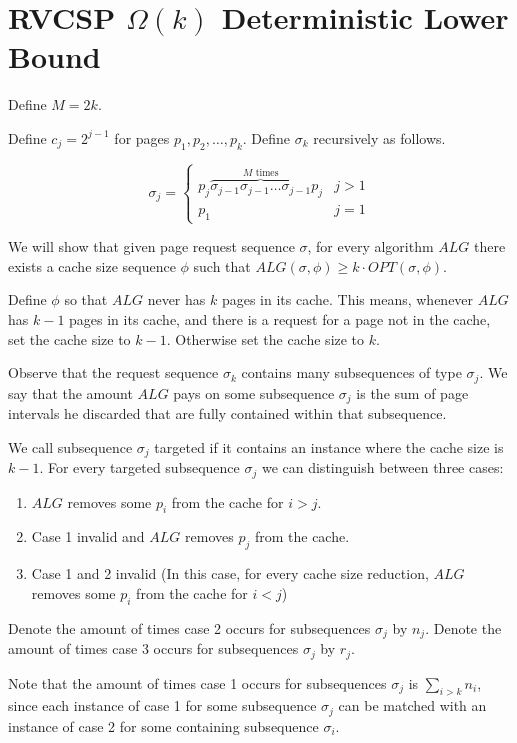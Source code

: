 \documentclass[12pt]{article}
\begin{document}
\section{RVCSP $\Omega(k)$ Deterministic Lower Bound}

Define $M=2k$. 

Define $c_j=2^{j-1}$ for pages $p_1, p_2, \ldots, p_k$.
Define $\sigma_k$ recursively as follows. 

\[
\sigma_j = \begin{cases}
  p_j \overbrace{\sigma_{j-1} \sigma_{j-1} \ldots \sigma_{j-1} }^{\text{$M$ times}} p_j & j > 1 \\
  p_1 & j = 1
\end{cases}
\] 

We will show that given page request sequence $\sigma$, for every algorithm $ALG$ there exists a cache size sequence $\phi$ such that $ALG(\sigma, \phi) \geq k \cdot OPT(\sigma, \phi)$.

Define $\phi$ so that $ALG$ never has $k$ pages in its cache. This means, whenever $ALG$ has $k-1$ pages in its cache, and there is a request for a page not in the cache, set the cache size to $k-1$. Otherwise set the cache size to $k$.

Observe that the request sequence $\sigma_k$ contains many subsequences of type $\sigma_j$. We say that the amount $ALG$ pays on some subsequence $\sigma_j$ is the sum of page intervals he discarded that are fully contained within that subsequence. 

We call subsequence $\sigma_j$ targeted if it contains an instance where the cache size is $k-1$.
For every targeted subsequence $\sigma_j$ we can distinguish between three cases:

\begin{enumerate}
  \item $ALG$ removes some $p_i$ from the cache for $i > j$. 
  \item Case 1 invalid and $ALG$ removes $p_j$ from the cache. 
  \item Case 1 and 2 invalid (In this case, for every cache size reduction, $ALG$ removes some $p_i$ from the cache for $i < j$)
\end{enumerate}

Denote the amount of times case 2 occurs for subsequences $\sigma_j$ by $n_j$. Denote the amount of times case 3 occurs for subsequences $\sigma_j$ by $r_j$.

Note that the amount of times case 1 occurs for subsequences $\sigma_j$ is $\sum_{i>k}n_i$, since each instance of case 1 for some subsequence $\sigma_j$ can be matched with an instance of case 2 for some containing subsequence $\sigma_i$.
\end{document}
